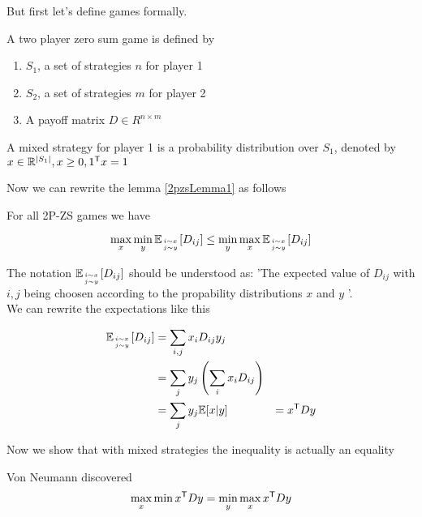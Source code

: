 But first let's define games formally.

\begin{Def}[2P-ZS Games] A two player zero sum game is defined by 
\begin{enumerate}
\item $S_1$, a set of strategies $n$ for player 1
\item $S_2$, a set of strategies $m$ for player 2
\item A payoff matrix $D\in R^{n\times m}$ %
\end{enumerate}
\end{Def}

\begin{Def} A mixed strategy for player 1 is a probability distribution over $S_1$, denoted by $x\in \mathbb{R}^{|S_1|}, x\geq 0, {1}^\text{\upshape \sffamily T} x=1$
\end{Def}

Now we can rewrite the lemma \ref{2pzsLemma1} as follows

\begin{lem} For all 2P-ZS games we have

\[\max_x\min_y\mathbb{E}_{{i\sim x}\atop {j\sim y}} [D_{ij}] \leq \min_y\max_x\mathbb{E}_{{i\sim x}\atop {j\sim y}} [D_{ij}]\]

\end{lem}

The notation $\mathbb{E}_{{i\sim x}\atop {j\sim y}} [D_{ij}]$ should be understood as: 'The expected value of $D_{ij}$ with $i,j$ being choosen according to the propability distributions $x$ and $y$ '.\\ 
We can rewrite the expectations like this

\begin{align*}
\mathbb{E}_{{i\sim x}\atop {j\sim y}} [D_{ij}] &= \sum_{i,j} x_i D_{ij}y_j\\
	&=\sum_j y_j \left(\sum_i x_iD_{ij}\right)\\
	&=\sum_j y_j \mathbb{E}[x|y]
	&={x}^\text{\upshape \sffamily T} D y
\end{align*}

Now we show that with mixed strategies the inequality is actually an equality

\begin{thm} Von Neumann discovered
\[\max_x\min {x}^\text{\upshape \sffamily T}Dy = \min_y\max_x {x}^\text{\upshape \sffamily T} Dy\]
\end{thm}

